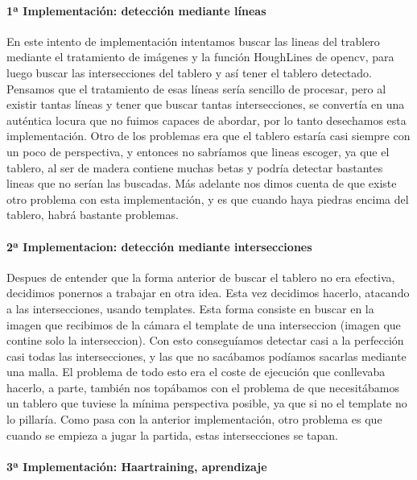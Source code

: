 \documentclass[12pt,a4paper]{report}
\begin{document}
\paragraph{1ª Implementación: detección mediante líneas}
En este intento de implementación intentamos buscar las lineas del trablero 
mediante el tratamiento de imágenes y la función HoughLines de opencv, para 
luego buscar las intersecciones del tablero y así tener el tablero detectado. 
Pensamos que el tratamiento de esas líneas sería sencillo de procesar, pero al
existir tantas líneas y tener que buscar tantas intersecciones, se convertía en
una auténtica locura que no fuimos capaces de abordar, por lo tanto desechamos
esta implementación. %
Otro de los problemas era que el tablero estaría casi siempre con un poco de
perspectiva, y entonces no sabríamos que lineas escoger, ya que el tablero, al
ser de madera contiene muchas betas y podría detectar bastantes lineas que no
serían las buscadas. 
Más adelante nos dimos cuenta de que existe otro problema con esta
implementación, y es que cuando haya piedras encima del tablero, habrá bastante
problemas. 
 

\paragraph{2ª Implementacion: detección mediante intersecciones}

Despues de entender que la forma anterior de buscar el tablero no era efectiva,
decidimos ponernos a trabajar en otra idea. Esta vez decidimos hacerlo, atacando
a las intersecciones, usando templates. Esta forma consiste en buscar en la
imagen que recibimos de la cámara el template de una interseccion (imagen
que contine solo la interseccion). Con esto conseguíamos detectar casi a la
perfección casi todas las intersecciones, y las que no sacábamos podíamos
sacarlas mediante una malla. %
El problema de todo esto era el coste de ejecución que conllevaba hacerlo, a
parte, también nos topábamos con el problema de que necesitábamos un tablero que
tuviese la mínima perspectiva posible, ya que si no el template no lo pillaría. 
Como pasa con la anterior implementación, otro problema es que cuando se empieza
a jugar la partida, estas intersecciones se tapan. 


\paragraph{3ª Implementación: Haartraining, aprendizaje}
\end{document}
